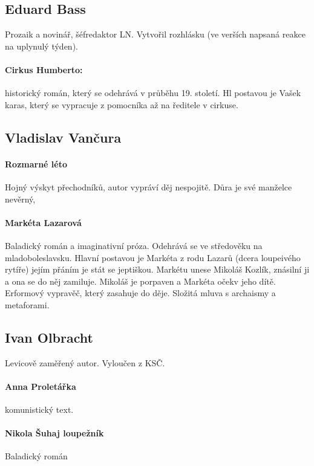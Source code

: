 \documentclass[10pt,a4page,headings,openany,%
oneside
,twocolumn
]{report}
\begin{document}
\subsection{Eduard Bass}

Prozaik a novinář, šéfredaktor LN. Vytvořil rozhlásku (ve verších napsaná reakce na uplynulý týden).

\paragraph{Cirkus Humberto:} historický román, který se odehrává v průběhu 19. století. Hl postavou je Vašek karas, který se vypracuje z pomocníka až na ředitele v cirkuse.

\subsection{Vladislav Vančura}

\paragraph{Rozmarné léto} Hojný výskyt přechodníků, autor vypráví děj nespojitě. Důra je své manželce nevěrný, 

\paragraph{Markéta Lazarová} Baladický román a imaginativní próza. Odehrává se ve středověku na mladoboleslavsku. Hlavní postavou je Markéta z rodu Lazarů (dcera loupeivého rytíře) jejím přáním je stát se jeptiškou. Markétu unese Mikoláš Kozlík, znásilní ji a ona se do něj zamiluje.	Mikoláš je porpaven a Markéta očekv jeho dítě. Erformový vypravěč, který zasahuje do děje. Složitá mluva s archaismy a metaforami.

\subsection{Ivan Olbracht}
Levicově zaměřený autor. Vyloučen z KSČ. 

\paragraph{Anna Proletářka} komunistický text.

\paragraph{Nikola Šuhaj loupežník} Baladický román
\end{document}
